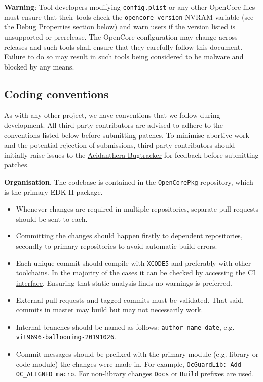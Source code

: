 \documentclass[]{article}
\providecommand{\tightlist}{%
  \setlength{\itemsep}{0pt}\setlength{\parskip}{0pt}}
\begin{document}
\textbf{Warning}: Tool developers modifying \texttt{config.plist} or any other OpenCore
files must ensure that their tools check the \texttt{opencore-version} NVRAM variable
(see the \hyperref[miscdebugprops]{Debug Properties} section below) and warn users
if the version listed is unsupported or prerelease. The OpenCore configuration may change
across releases and such tools shall ensure that they carefully follow this document. Failure
to do so may result in such tools being considered to be malware and blocked by any means.

\subsection{Coding conventions}\label{configuration-conv}

As with any other project, we have conventions that we follow during development.
All third-party contributors are advised to adhere to the conventions listed below
before submitting patches. To minimise abortive work and the potential rejection of
submissions, third-party contributors should initially raise issues to the
\href{https://github.com/acidanthera/bugtracker}{Acidanthera Bugtracker}
for feedback before submitting patches.

\textbf{Organisation}. The codebase is contained in the \texttt{OpenCorePkg} repository,
which is the primary EDK II package.
\begin{itemize}
\tightlist
\item Whenever changes are required in multiple repositories, separate pull requests should
be sent to each.
\item Committing the changes should happen firstly to dependent repositories, secondly to
primary repositories to avoid automatic build errors.
\item Each unique commit should compile with \texttt{XCODE5} and preferably with other
toolchains. In the majority of the cases it can be checked by accessing the
\href{https://travis-ci.com/acidanthera}{CI interface}. Ensuring that static analysis finds
no warnings is preferred.
\item External pull requests and tagged commits must be validated. That said, commits in
master may build but may not necessarily work.
\item Internal branches should be named as follows: \texttt{author-name-date}, e.g.
\texttt{vit9696-ballooning-20191026}.
\item Commit messages should be prefixed with the primary module (e.g. library or code module) the
changes were made in. For example, \texttt{OcGuardLib: Add OC\_ALIGNED macro}. For non-library changes
\texttt{Docs} or \texttt{Build} prefixes are used.
\end{itemize}
\end{document}
